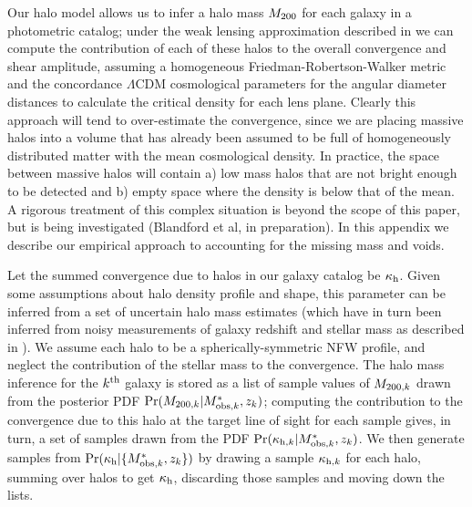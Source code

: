 \documentclass[useAMS,usenatbib]{mn2e}
\begin{document}
Our halo model allows us to infer a halo mass $M_{200}$ for each galaxy in a
photometric catalog; under the weak lensing approximation described in
 we can compute the contribution of each of these halos to
the overall convergence and shear amplitude, assuming a homogeneous
Friedman-Robertson-Walker metric and the concordance $\Lambda$CDM cosmological
parameters for the angular diameter distances to calculate the critical
density for each lens plane. Clearly this approach will tend to over-estimate
the convergence, since we are placing massive halos into a volume that has
already been assumed to be full of homogeneously distributed matter with the 
mean cosmological density. In practice, the space between massive halos will
contain a) low mass halos that are not bright enough to be detected and b)
empty space where the density is below that of the mean. A rigorous treatment
of this complex situation is beyond the scope of this paper, but is being
investigated (Blandford et al, in preparation). In this appendix we describe
our empirical approach to accounting for the missing mass and voids. 

Let the summed convergence due to halos in our galaxy catalog be $\kappa_{\rm h}$.
Given some assumptions about halo density profile and shape, this parameter
can be inferred from a set of uncertain halo mass estimates (which have in
turn been inferred from noisy measurements of galaxy redshift and stellar mass
as described in ). We assume each halo to be a
spherically-symmetric NFW profile, and neglect the contribution of the stellar
mass to the convergence. The halo mass inference for the $k^{\rm th}$ galaxy 
is stored as a list of sample values of $M_{200,k}$ drawn from the posterior PDF
${\rm Pr}(M_{200,k}|M^{*}_{{\rm obs},k},z_k)$; computing the contribution to the convergence
due to this halo at the target line of sight for each sample gives, in turn, 
a set of
samples drawn from the PDF ${\rm Pr}(\kappa_{{\rm h},k}|M^{*}_{{\rm obs},k},z_k)$. We then generate
samples from ${\rm Pr}(\kappa_{\rm h}|\{M^{*}_{{\rm obs},k},z_k\})$ by drawing a sample $\kappa_{{\rm h},k}$
for each halo, summing over halos to get $\kappa_{\rm h}$, discarding those
samples and moving down the lists.
\end{document}

